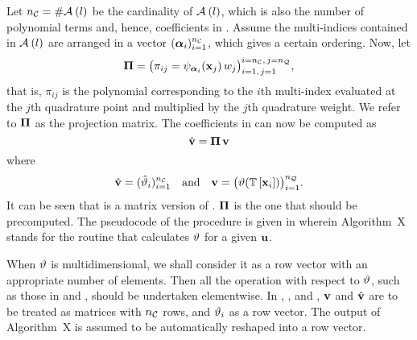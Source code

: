Let ${n_\mathcal{C}} = \# \mathcal{A}_{}\left( l \right)$ be the cardinality of $\mathcal{A}_{}\left( l \right)$, which is also the number of polynomial terms and, hence, coefficients in .
Assume the multi-indices contained in $\mathcal{A}_{}\left( l \right)$ are arranged in a vector $(\bm{\alpha}_i)_{i = 1}^{n_\mathcal{C}}$, which gives a certain ordering.
Now, let
\begin{equation} \elab{projection-matrix}
  \projection = \big( \pi_{ij} = \polynomial_{\multiindex_i}(\point_j) \, \weight_j \big)_{i = 1, \, j = 1}^{i = \ncorder, \, j = \nqorder},
\end{equation}
that is, $\pi_{ij}$ is the polynomial corresponding to the $i$th multi-index evaluated at the $j$th quadrature point and multiplied by the $j$th quadrature weight.
We refer to $\bm{\Pi}$ as the projection matrix.
The coefficients in  can now be computed as
\begin{equation} \elab{coefficient-evaluation}
  \coefficient{\evw} = \projection \, \evw
\end{equation}
where
\begin{equation} \elab{quantity-evaluation}
  \coefficient{\evw} = (\coefficient{\w}_i)_{i = 1}^\ncorder \hspace{1em} \text{and} \hspace{1em} \evw = \big(\w(\transformation{\point_i}) \big)_{i = 1}^\nqorder.
\end{equation}
It can be seen that  is a matrix version of .
$\bm{\Pi}$ is the one that should be precomputed.
The pseudocode of the procedure is given in  wherein Algorithm~X stands for the routine that calculates $\vartheta$ for a given $\mathbf{u}$.


\begin{remark} 
When $\vartheta$ is multidimensional, we shall consider it as a row vector with an appropriate number of elements.
Then all the operation with respect to $\vartheta$, such as those in  and , should be undertaken elementwise.
In , , and , $\mathbf{v}$ and $\hat{\mathbf{v}}$ are to be treated as matrices with ${n_\mathcal{C}}$ rows, and $\vartheta_i$ as a row vector.
The output of Algorithm~X is assumed to be automatically reshaped into a row vector.
\end{remark}
